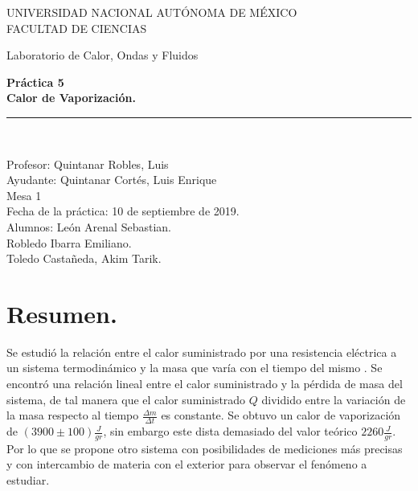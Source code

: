 \documentclass[a4paper]{article}
\begin{document}
\begin{titlepage}
\begin{center}
\begin{figure}
\end{figure}
\vspace*{0.5in}
UNIVERSIDAD NACIONAL AUTÓNOMA DE MÉXICO\\
\vspace*{0.2in}
FACULTAD DE CIENCIAS \\
\vspace*{0.5in}
\begin{large}
Laboratorio de Calor, Ondas y Fluidos\\
\end{large}
\vspace*{0.2in}
\begin{Large}
\textbf{Práctica 5} \\
\textbf{Calor de Vaporización.} \\
\end{Large}
\vspace*{0.3in}
\vspace*{0.3in}
\rule{80mm}{0.1mm}\\
\vspace*{0.1in}
\begin{large}
Profesor:  Quintanar Robles, Luis  \\
Ayudante: Quintanar Cortés, Luis Enrique \\
Mesa 1\\
Fecha de la práctica: 10 de septiembre de 2019.\\
Alumnos: León Arenal Sebastian.\\
Robledo Ibarra Emiliano. \\
Toledo Castañeda, Akim Tarik.\\

\end{large}
\end{center}
\end{titlepage}



\section*{Resumen.}
Se estudió la relación entre el calor suministrado por una resistencia eléctrica a un sistema termodinámico y la masa que varía con el tiempo del mismo . Se encontró una relación lineal entre el calor suministrado y la pérdida de masa del sistema, de tal manera que el calor suministrado $Q$ dividido entre la variación de la masa respecto al tiempo $\frac{\Delta m}{\Delta t}$ es constante. Se obtuvo un calor de vaporización de $(3900\pm100)\frac{J}{gr}$, sin embargo este dista demasiado del valor teórico $2260\frac{J}{gr}$. Por lo que se propone otro sistema con posibilidades de mediciones más precisas y con intercambio de materia con el exterior para observar el fenómeno a estudiar.
\end{document}
